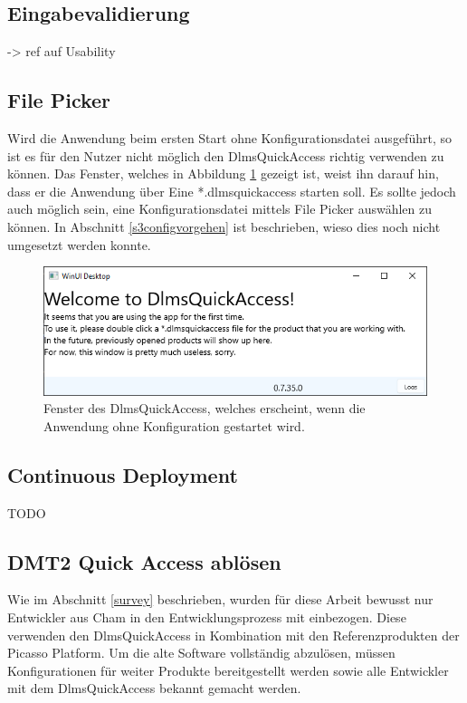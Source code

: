 \subsection{Eingabevalidierung}
-> ref auf Usability

\subsection{File Picker}\label{ausblick:filePicker}
Wird die Anwendung beim ersten Start ohne Konfigurationsdatei ausgeführt, so ist es für den Nutzer nicht möglich den DlmsQuickAccess richtig verwenden zu können.
Das Fenster, welches in Abbildung \ref{fig:welcomeScreenEmpty} gezeigt ist, weist ihn darauf hin, dass er die Anwendung über Eine *.dlmsquickaccess starten soll.
Es sollte jedoch auch möglich sein, eine Konfigurationsdatei mittels File Picker auswählen zu können.
In Abschnitt \ref{s3configvorgehen} ist beschrieben, wieso dies noch nicht umgesetzt werden konnte.

\begin{figure}[H]
   \centering
   \includegraphics[width=1.0\textwidth]{gfx/welcomeScreenEmpty.png}
   \caption{
       Fenster des DlmsQuickAccess, welches erscheint, wenn die Anwendung ohne Konfiguration gestartet wird.
   }
   \label{fig:welcomeScreenEmpty}
\end{figure}

\subsection{Continuous Deployment}
TODO

\subsection{\ac{DMT2} Quick Access ablösen}
Wie im Abschnitt \ref{survey} beschrieben, wurden für diese Arbeit bewusst nur Entwickler aus Cham in den Entwicklungsprozess mit einbezogen.
Diese verwenden den DlmsQuickAccess in Kombination mit den Referenzprodukten der Picasso Platform.
Um die alte Software vollständig abzulösen, müssen Konfigurationen für weiter Produkte bereitgestellt werden sowie alle Entwickler mit dem DlmsQuickAccess bekannt gemacht werden.


